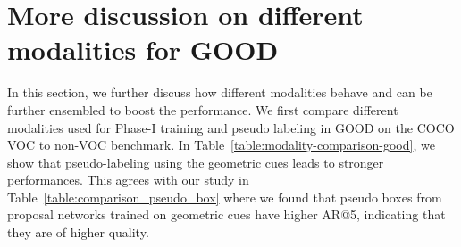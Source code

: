 \documentclass{article} \usepackage{iclr2023_conference,times}
\begin{document}
\begin{table}
\centering
{}
    \caption{\textbf{Architecture choice.} FCOS is a single-stage proposal-free object detector, and OLN is a two-stage proposal-based object detector (modified from Faster R-CNN). GOOD can significantly improve the open-world performance of both architectures.}\label{table:fcos}
\end{table}




\section{More discussion on different modalities for GOOD}\label{appdex:modalities}

In this section, we further discuss how different modalities behave and can be further ensembled to boost the performance. 
We first compare different modalities used for Phase-I training and pseudo labeling in GOOD on the COCO VOC to non-VOC benchmark. 
In Table~\ref{table:modality-comparison-good}, we show that pseudo-labeling using the geometric cues leads to stronger performances. This agrees with our study in Table~\ref{table:comparison_pseudo_box} where we found that pseudo boxes from proposal networks trained on geometric cues have higher AR@5, indicating that they are of higher quality.
\end{document}
